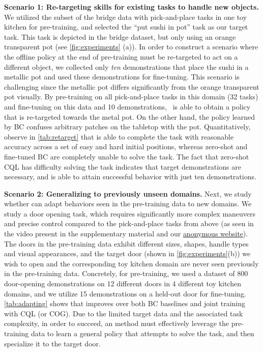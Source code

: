\textbf{Scenario 1: Re-targeting skills for existing tasks to handle new objects.} We utilized the subset of the bridge data with pick-and-place tasks in one toy kitchen for pre-training, and selected the ``put sushi in pot'' task as our target task. This task is depicted in the bridge dataset, but only using an orange transparent pot (see \autoref{fig:experiments} (a)). In order to construct a scenario where the offline policy at the end of pre-training must be re-targeted to act on a different object, we collected only \emph{ten} demonstrations that place the sushi in a metallic pot and used these demonstrations for fine-tuning.
This scenario is challenging since the metallic pot differs significantly from the orange transparent pot visually. 
By pre-training on all pick-and-place tasks in this domain (32 tasks) and fine-tuning on this data and 10 demonstrations, \ptrmethodname\ is able to obtain a policy that is re-targeted towards the metal pot. On the other hand, the policy learned by BC confuses arbitrary patches on the tabletop with the pot. Quantitatively, observe in \autoref{tab:retarget} that \ptrmethodname is able to complete the task with reasonable accuracy across a set of easy and hard initial positions, whereas zero-shot and fine-tuned BC are completely unable to solve the task. The fact that zero-shot CQL has difficulty solving the task indicates that target demonstrations are necessary, and \ptrmethodname is able to attain successful behavior with just ten demonstrations.

\textbf{Scenario 2: Generalizing to previously unseen domains.} Next, we study whether \ptrmethodname can adapt behaviors seen in the pre-training data to new domains. We study a door opening task, which requires significantly more complex maneuvers and precise control compared to the pick-and-place tasks from above (as seen in the video present in the supplementary material and our \hyperlink{https://sites.google.com/view/ptr-rss}{anonymous website}).
The doors in the pre-training data exhibit different sizes, shapes, handle types and visual appearances, and the target door (shown in \autoref{fig:experiments}(b)) we wish to open and the corresponding toy kitchen domain are never seen previously in the pre-training data. Concretely, for pre-training, we used a dataset of 800 door-opening demonstrations on 12 different doors in 4 different toy kitchen domains, and we utilize 15 demonstrations on a held-out door for fine-tuning. \autoref{tab:adapting} shows that \ptrmethodname improves over both BC baselines and joint training with CQL (or COG). Due to the limited target data and the associated task complexity, in order to succeed, an method must effectively leverage the pre-training data to learn a general policy that attempts to solve the task, and then specialize it to the target door.

